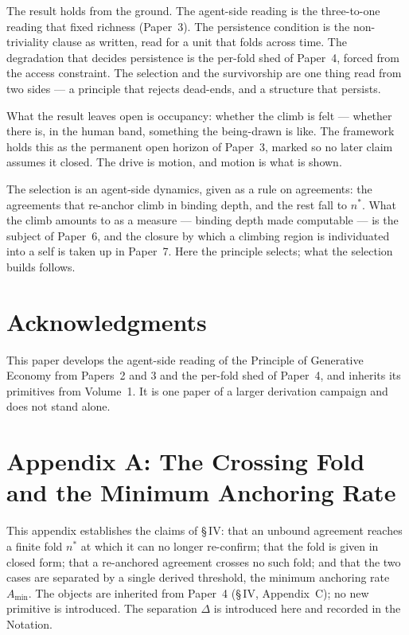 \documentclass[11pt,oneside]{report}
\theoremstyle{definition}
\theoremstyle{remark}
\begin{document}
The result holds from the ground. The agent-side reading is the three-to-one reading
that fixed richness (Paper~3). The persistence condition is the non-triviality clause
as written, read for a unit that folds across time. The degradation that decides
persistence is the per-fold shed of Paper~4, forced from the access constraint. The
selection and the survivorship are one thing read from two sides --- a principle that
rejects dead-ends, and a structure that persists.

What the result leaves open is occupancy: whether the climb is felt --- whether there
is, in the human band, something the being-drawn is like. The framework holds this as
the permanent open horizon of Paper~3, marked so no later claim assumes it closed. The
drive is motion, and motion is what is shown.

The selection is an agent-side dynamics, given as a rule on agreements: the agreements
that re-anchor climb in binding depth, and the rest fall to \ensuremath{n^{*}}. What
the climb amounts to as a measure --- binding depth made computable --- is the subject
of Paper~6, and the closure by which a climbing region is individuated into a self is
taken up in Paper~7. Here the principle selects; what the selection builds follows.

\section*{Acknowledgments}

This paper develops the agent-side reading of the Principle of Generative Economy from
Papers~2 and 3 and the per-fold shed of Paper~4, and inherits its primitives from
Volume~1. It is one paper of a larger derivation campaign and does not stand alone.

\section*{Appendix A: The Crossing Fold and the Minimum Anchoring Rate}

This appendix establishes the claims of \S\,IV: that an unbound agreement reaches a
finite fold \ensuremath{n^{*}} at which it can no longer re-confirm; that the fold is
given in closed form; that a re-anchored agreement crosses no such fold; and that the
two cases are separated by a single derived threshold, the minimum anchoring rate
\ensuremath{A_{\min}}. The objects are inherited from Paper~4 (\S\,IV, Appendix~C); no
new primitive is introduced. The separation \ensuremath{\Delta} is introduced here and
recorded in the Notation.
\end{document}
